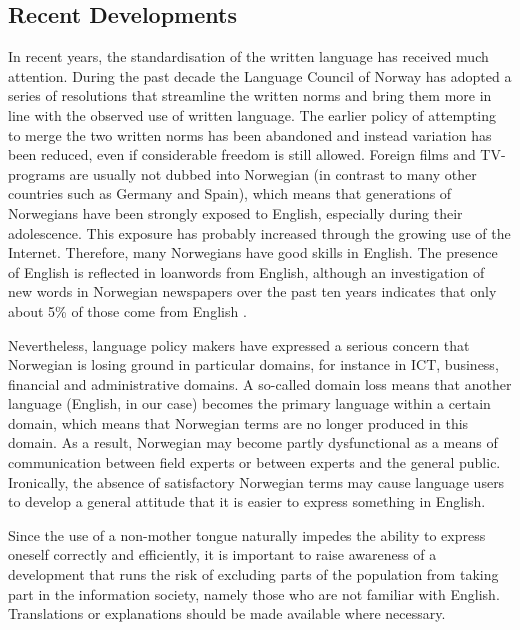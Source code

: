 \begin{multicols}{2}
\subsection{Recent Developments}

In recent years, the standardisation of the written language has received much attention. 
During the past decade the Language Council of Norway has adopted a series of resolutions that streamline the written norms and bring them more in line with the observed use of written language. 
The earlier policy of attempting to merge the two written norms has been abandoned and instead variation has been reduced, even if considerable freedom is still allowed.
Foreign films and TV-programs are usually not dubbed into Norwegian (in contrast to many other countries such as Germany and Spain), which means that generations of Norwegians have been strongly exposed to English, especially during their adolescence. 
This exposure has probably increased through the growing use of the Internet. 
Therefore, many Norwegians have good skills in English. 
The presence of English is reflected in loanwords from English, although an investigation of new words in Norwegian newspapers over the past ten years indicates that only about 5\% of those come from English \cite{And:2011}.


Nevertheless, language policy makers have expressed a serious concern \cite{nih:2005} that Norwegian is losing ground in particular domains, for instance in ICT, business, financial and administrative domains. 
A so-called domain loss means that another language (English, in our case) becomes the primary language within a certain domain, which means that Norwegian terms are no longer produced in this domain. 
As a result, Norwegian may become partly dysfunctional as a means of communication between field experts or between experts and the general public. 
Ironically, the absence of satisfactory Norwegian terms may cause language users to develop a general attitude that it is easier to express something in English. 

Since the use of a non-mother tongue naturally impedes the ability to express oneself correctly and efficiently, it is important to raise awareness of a development that runs the risk of excluding parts of the population from taking part in the information society, namely those who are not familiar with English.
Translations or explanations should be made available where necessary.


\end{multicols}

